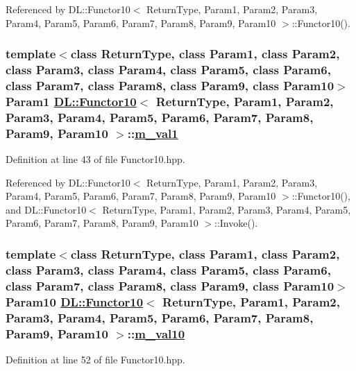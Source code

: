 Referenced by DL::Functor10$<$ Return\-Type, Param1, Param2, Param3, Param4, Param5, Param6, Param7, Param8, Param9, Param10 $>$::Functor10().\hypertarget{classDL_1_1Functor10_r1}{
\subsubsection[m\_\-val1]{\setlength{\rightskip}{0pt plus 5cm}template$<$class Return\-Type, class Param1, class Param2, class Param3, class Param4, class Param5, class Param6, class Param7, class Param8, class Param9, class Param10$>$ Param1 \hyperlink{classDL_1_1Functor10}{DL::Functor10}$<$ Return\-Type, Param1, Param2, Param3, Param4, Param5, Param6, Param7, Param8, Param9, Param10 $>$::\hyperlink{classDL_1_1Functor10_r1}{m\_\-val1}}}
\label{classDL_1_1Functor10_r1}




Definition at line 43 of file Functor10.hpp.

Referenced by DL::Functor10$<$ Return\-Type, Param1, Param2, Param3, Param4, Param5, Param6, Param7, Param8, Param9, Param10 $>$::Functor10(), and DL::Functor10$<$ Return\-Type, Param1, Param2, Param3, Param4, Param5, Param6, Param7, Param8, Param9, Param10 $>$::Invoke().\hypertarget{classDL_1_1Functor10_r10}{
\subsubsection[m\_\-val10]{\setlength{\rightskip}{0pt plus 5cm}template$<$class Return\-Type, class Param1, class Param2, class Param3, class Param4, class Param5, class Param6, class Param7, class Param8, class Param9, class Param10$>$ Param10 \hyperlink{classDL_1_1Functor10}{DL::Functor10}$<$ Return\-Type, Param1, Param2, Param3, Param4, Param5, Param6, Param7, Param8, Param9, Param10 $>$::\hyperlink{classDL_1_1Functor10_r10}{m\_\-val10}}}
\label{classDL_1_1Functor10_r10}




Definition at line 52 of file Functor10.hpp.

